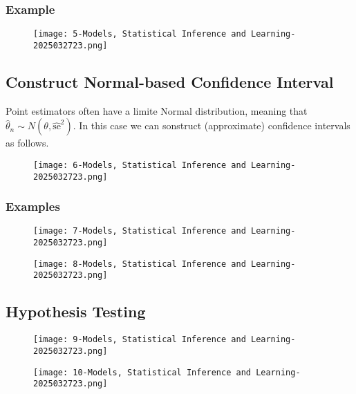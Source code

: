 \subsubsection{Example}

\begin{figure}[H]
\centering
\texttt{[image: 5-Models, Statistical Inference and Learning-2025032723.png]}
\label{}
\end{figure}

\subsection{Construct Normal-based Confidence Interval}

Point estimators often have a limite Normal distribution, meaning that $\widehat{\theta}_n\sim N(\theta,\widehat{\text{se}}^2)$. In this case we can sonstruct (approximate) confidence intervals as follows.

\begin{figure}[H]
\centering
\texttt{[image: 6-Models, Statistical Inference and Learning-2025032723.png]}
\label{}
\end{figure}

\subsubsection{Examples}

\begin{figure}[H]
\centering
\texttt{[image: 7-Models, Statistical Inference and Learning-2025032723.png]}
\label{}
\end{figure}

\begin{figure}[H]
\centering
\texttt{[image: 8-Models, Statistical Inference and Learning-2025032723.png]}
\label{}
\end{figure}

\subsection{Hypothesis Testing}

\begin{figure}[H]
\centering
\texttt{[image: 9-Models, Statistical Inference and Learning-2025032723.png]}
\label{}
\end{figure}

\begin{figure}[H]
\centering
\texttt{[image: 10-Models, Statistical Inference and Learning-2025032723.png]}
\label{}
\end{figure}
